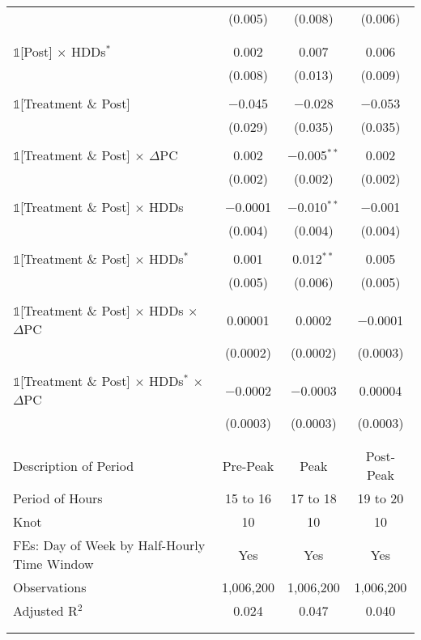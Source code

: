 {\begin{table}[t!]
\begin{ThreePartTable}
\begin{longtable}{@{\extracolsep{45pt}}lccc}
                & (0.005) & (0.008) & (0.006) \\
                & & & \\
                & & & \\
                $\mathbb{1}$[Post] $\times$ HDDs$^{*}$ & 0.002 & 0.007 & 0.006 \\
                & (0.008) & (0.013) & (0.009) \\
                & & & \\
                $\mathbb{1}$[Treatment \& Post] & $-$0.045 & $-$0.028 & $-$0.053 \\
                & (0.029) & (0.035) & (0.035) \\
                & & & \\
                $\mathbb{1}$[Treatment \& Post] $\times$ $\Delta$PC & 0.002 & $-$0.005$^{**}$ & 0.002 \\
                & (0.002) & (0.002) & (0.002) \\
                & & & \\
                $\mathbb{1}$[Treatment \& Post] $\times$ HDDs & $-$0.0001 & $-$0.010$^{**}$ & $-$0.001 \\
                & (0.004) & (0.004) & (0.004) \\
                & & & \\
                $\mathbb{1}$[Treatment \& Post] $\times$ HDDs$^{*}$ & 0.001 & 0.012$^{**}$ & 0.005 \\
                & (0.005) & (0.006) & (0.005) \\
                & & & \\
                $\mathbb{1}$[Treatment \& Post] $\times$ HDDs $\times$ $\Delta$PC & 0.00001 & 0.0002 & $-$0.0001 \\
                & (0.0002) & (0.0002) & (0.0003) \\
                & & & \\
                $\mathbb{1}$[Treatment \& Post] $\times$ HDDs$^{*}$ $\times$ $\Delta$PC & $-$0.0002 & $-$0.0003 & 0.00004 \\
                & (0.0003) & (0.0003) & (0.0003) \\
                & & & \\
                \hline
                \\[-2.0ex]
                Description of Period & Pre-Peak & Peak & Post-Peak \\
                Period of Hours & 15 to 16 & 17 to 18 & 19 to 20 \\
                Knot & 10 & 10 & 10 \\
                FEs: Day of Week by Half-Hourly Time Window & Yes & Yes & Yes \\
                Observations & 1,006,200 & 1,006,200 & 1,006,200 \\
                Adjusted R$^{2}$ & 0.024 & 0.047 & 0.040 \\
                \\[-2.0ex]
                \hline \hline
                \\[-4.5ex]


\end{longtable}
\end{ThreePartTable}
\end{table}}

